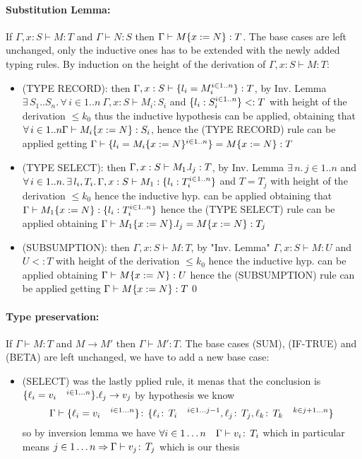 \paragraph*{Substitution Lemma:\\}
If $\Gamma, x: S \vdash M: T$ and $\Gamma \vdash N: S$ then $\Gamma
\vdash M\{x:=N\}: T$.  The base cases are left unchanged, only the
inductive ones has to be extended with the newly added typing rules.
By induction on the height of the derivation of $\Gamma, x: S \vdash
M: T$:
\begin{itemize}
\item (TYPE RECORD): then $\Gamma, x: S \vdash \{l_i=M_i^{i \in
    1..n}\}: T$, by Inv. Lemma $\exists\, S_1..S_n.\,\forall\, i \in
  1..n\ \Gamma, x: S \vdash M_i: S_i$ and $\{l_i: S_i^{i \in
      1..n}\} <: T$ with height of the derivation $\le k_0$ thus the
  inductive hypothesis can be applied, obtaining that $\forall\, i \in
  1..n \Gamma \vdash M_i\{x:=N\}: S_i$, hence the (TYPE RECORD)
  rule can be applied getting $\Gamma \vdash \{l_i =
    M_i\{x:=N\}^{i \in 1..n}\} = M\{x:=N\} : T$
\item (TYPE SELECT): then $\Gamma, x: S \vdash M_1.l_j: T$, by
  Inv. Lemma $\exists\, n.\, j \in 1..n$ and $\forall\, i \in 1..n.\,
  \exists\, l_i, T_i.\, \Gamma, x: S \vdash M_1: \{l_i: T_i^{i \in
      1..n}\}$ and $T = T_j$ with height of the derivation $\le k_0$
  hence the inductive hyp. can be applied obtaining that $\Gamma
  \vdash M_1\{x:=N\}: \{l_i: T_i^{i \in 1..n}\}$ hence the
  (TYPE SELECT) rule can be applied obtaining $\Gamma \vdash
  M_1\{x:=N\}.l_j = M\{x:=N\}: T_j$
\item (SUBSUMPTION): then $\Gamma, x:S \vdash M: T$, by "Inv. Lemma"
  $\Gamma, x: S \vdash M: U$ and $U <: T$ with height of the
  derivation $\le k_0$ hence the inductive hyp. can be applied
  obtaining $\Gamma \vdash M\{x:=N\}: U$ hence the (SUBSUMPTION)
  rule can be applied getting $\Gamma \vdash M\{x:=N\}: T$\qed
\end{itemize}

\paragraph*{Type preservation:\\}
If $\Gamma \vdash M: T$ and $M \to M'$ then $\Gamma \vdash M': T$.
The base cases (SUM), (IF-TRUE) and (BETA) are left unchanged, we have
to add a new base case:
\begin{itemize}
\item (SELECT) was the lastly pplied rule, it menas that the
  conclusion is \(\{\ell_i = v_i \quad^{i\in 1\dots n}\}.\ell_j \to
  v_j\) by hypothesis we know \[\Gamma \vdash \{\ell_i = v_i
    \quad^{i\in 1\dots n}\} \!:\,\{\ell_i \!:\,T_i \quad^{i\in
        1\dots j-1}, \ell_j \!:\,T_j, \ell_k \!:\,T_k \quad^{k\in
        j+1\dots n}\}\] so by inversion lemma we have \(\forall i \in
  1 \dots n \quad \Gamma\vdash v_i\!:\,T_i\) which in particular
  means \(j\in 1\dots n \Rightarrow \Gamma \vdash v_j \!:\,T_j\)
  which is our thesis
\end{itemize}

